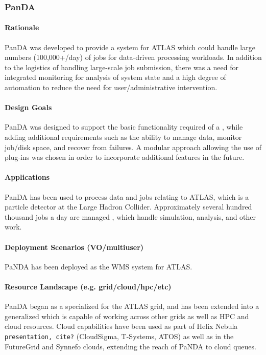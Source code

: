\documentclass{sig-alternate}
\begin{document}
\subsubsection{PanDA}

\paragraph{Rationale}
PanDA was developed to provide a \pilotjob system for ATLAS 
which could
handle large numbers (100,000+/day) of jobs for data-driven processing workloads.
In addition to the logistics of handling large-scale job submission, there was
a need for integrated monitoring for analysis of system state and a high
degree of automation to reduce the need for user/administrative intervention.

\paragraph{Design Goals}
PanDA was designed to support the basic functionality required of a
\pilotjob, while adding additional requirements such as the ability
to manage data, monitor job/disk space, and recover from failures.
A modular approach allowing the use of plug-ins was chosen in order
to incorporate additional features in the future.

\paragraph{Applications}
PanDA has been used to process data and jobs relating to ATLAS, which is
a particle detector at the Large Hadron Collider.  Approximately
several hundred thousand jobs a day are managed , which handle
simulation, analysis, and other work.

\paragraph{Deployment Scenarios (VO/multiuser)}
PaNDA has been deployed as the WMS system for ATLAS.  

\paragraph{Resource Landscape (e.g. grid/cloud/hpc/etc)}
PanDA began as a specialized \pilotjob for the ATLAS grid, and has been extended
into a generalized \pilotjob which is capable of working across other grids
as well as HPC and cloud resources.  
Cloud capabilities have been used as part
of Helix Nebula \texttt{presentation, cite?} (CloudSigma, T-Systems, ATOS) as well
as in the FutureGrid and Synnefo clouds, extending the reach of PaNDA to
cloud queues.  
\end{document}
